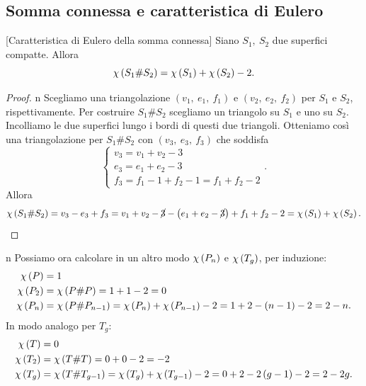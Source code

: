\subsection{Somma connessa e caratteristica di Eulero}
\begin{lemma}{}[Caratteristica di Eulero della somma connessa]
	Siano $S_1,\ S_2$ due superfici compatte. Allora
	\begin{equation*}
		\euler{S_1\# S_2}{\ }=\euler{S_1}{\ }+\euler{S_2}{\ }-2.
	\end{equation*}
\end{lemma}
\begin{proof}{n}
	Scegliamo una triangolazione $\left(v_1,\ e_1,\ f_1\right)$ e $\left(v_2,\ e_2,\ f_2\right)$ per $S_1$ e $S_2$, rispettivamente. Per costruire $S_1\# S_2$ scegliamo un triangolo su $S_1$ e uno su $S_2$. Incolliamo le due superfici lungo i bordi di questi due triangoli. Otteniamo così una triangolazione per $S_1\# S_2$ con $\left(v_3,\ e_3,\ f_3\right)$ che soddisfa
	\begin{equation*}
			\begin{cases}
				v_3=v_1+v_2-3\\
				e_3=e_1+e_2-3\\
				f_3=f_1-1+f_2-1=f_1+f_2-2
			\end{cases}.
	\end{equation*}
	Allora
	\begin{equation*}
		\euler{S_1\# S_2}{\ }=v_3-e_3+f_3=v_1+v_2-\cancel{3}-\left(e_1+e_2-\cancel{3}\right)+f_1+f_2-2=\euler{S_1}{\ }+\euler{S_2}{\ }.\qedhere
	\end{equation*}
\end{proof}
\begin{remark}{n}
	Possiamo ora calcolare in un altro modo $\euler{P_n}{\ }$ e $\euler{T_g}{\ }$, per induzione:
	\begin{align*}
			\euler{P}{\ }&=1\\
			\euler{P_2}{\ }&=\euler{P\# P}{\ }=1+1-2=0\\
			\euler{P_n}{\ }&=\euler{P\# P_{n-1}}{\ }=\euler{P_n}{\ }+\euler{P_{n-1}}{\ }-2=1+2-\left(n-1\right)-2=2-n.
	\end{align*}
In modo analogo per $T_g$:
\begin{align*}
		\euler{T}{\ }&=0\\
		\euler{T_2}{\ }&=\euler{T\# T}{\ }=0+0-2=-2\\
		\euler{T_g}{\ }&=\euler{T\# T_{g-1}}{\ }=\euler{T_g}{\ }+\euler{T_{g-1}}{\ }-2=0+2-2\left(g-1\right)-2=2-2g.
\end{align*}
\end{remark}
